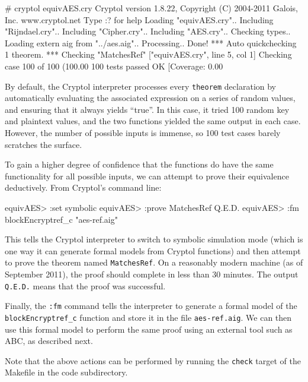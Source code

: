 \documentclass[11pt]{article}
\begin{document}
\begin{code}


# cryptol equivAES.cry
Cryptol version 1.8.22, Copyright (C) 2004-2011 Galois, Inc.
                                            www.cryptol.net 
Type :? for help
Loading "equivAES.cry"..
  Including "Rijndael.cry"..
  Including "Cipher.cry"..
  Including "AES.cry".. Checking types..
  Loading extern aig from "../aes.aig".. Processing.. Done!
*** Auto quickchecking 1 theorem.
*** Checking "MatchesRef" ["equivAES.cry", line 5, col 1]
Checking case 100 of 100 (100.00%
100 tests passed OK
[Coverage: 0.00%
\end{code}

By default, the Cryptol interpreter processes every \texttt{theorem}
declaration by automatically evaluating the associated expression on a
series of random values, and ensuring that it always yields ``true''.
In this case, it tried 100 random key and plaintext values, and the two
functions yielded the same output in each case. However, the number of
possible inputs is immense, so 100 test cases barely scratches the
surface.

To gain a higher degree of confidence that the functions do have the
same functionality for all possible inputs, we can attempt to prove
their equivalence deductively. From Cryptol's command line:

\begin{code}
equivAES> :set symbolic
equivAES> :prove MatchesRef
Q.E.D.
equivAES> :fm blockEncryptref_c "aes-ref.aig"
\end{code}

This tells the Cryptol interpreter to switch to symbolic simulation mode
(which is one way it can generate formal models from Cryptol functions)
and then attempt to prove the theorem named \texttt{MatchesRef}. On a
reasonably modern machine (as of September 2011), the proof should
complete in less than 30 minutes. The output \texttt{Q.E.D.} means that
the proof was successful.

Finally, the \texttt{:fm} command tells the interpreter to generate a
formal model of the \texttt{blockEncryptref\_c} function and store it in
the file \texttt{aes-ref.aig}. We can then use this formal model to
perform the same proof using an external tool such as ABC, as described
next.

Note that the above actions can be performed by running the
\texttt{check} target of the Makefile in the code subdirectory.
\end{document}
